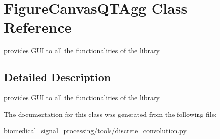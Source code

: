 \hypertarget{classFigureCanvasQTAgg}{}\section{Figure\+Canvas\+Q\+T\+Agg Class Reference}
\label{classFigureCanvasQTAgg}


provides G\+UI to all the functionalities of the library  




\subsection{Detailed Description}
provides G\+UI to all the functionalities of the library 

The documentation for this class was generated from the following file\+:\begin{DoxyCompactItemize}
\item 
biomedical\+\_\+signal\+\_\+processing/tools/\hyperlink{discrete__convolution_8py}{discrete\+\_\+convolution.\+py}\end{DoxyCompactItemize}

